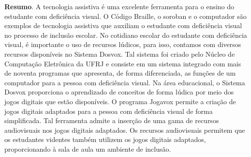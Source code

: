 	
	\vspace{24pt}



	\noindent\textbf{Resumo}.\label{wps} 
	A tecnologia assistiva é uma excelente ferramenta para o ensino do estudante com deficiência visual. O Código Braille, o soroban e o computador são exemplos de tecnologia assistiva que auxiliam o estudante com deficiência visual no processo de inclusão escolar. No cotidiano escolar do estudante com deficiência visual, é importante o uso de recursos lúdicos, para isso, contamos com diversos recursos disponíveis no Sistema Dosvox. Tal sistema foi criado pelo Núcleo de Computação Eletrônica da UFRJ e consiste em um sistema integrado com mais de noventa programas que apresenta, de forma diferenciada, as funções de um computador para a pessoa com deficiência visual. Na área educacional, o Sistema Dosvox proporciona o aprendizado de conceitos de forma lúdica por meio dos jogos digitais que estão disponíveis. O programa Jogavox permite a criação de jogos digitais adaptados para a pessoa com deficiência visual de forma simplificada. Tal ferramenta admite a inserção de uma gama de recursos audiovisuais nos jogos digitais adaptados. Os recursos audiovisuais permitem que os estudantes videntes também utilizem os jogos digitais adaptados, proporcionando à sala de aula um ambiente de inclusão.
	
